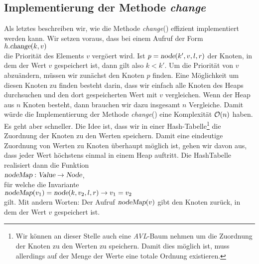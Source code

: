 \subsection{Implementierung der Methode \textsl{change}}
Als letztes beschreiben wir, wie die Methode \textsl{change}() effizient implementiert werden kann.
Wir setzen voraus, dass bei einem Aufruf der Form \\[0.1cm]
\hspace*{1.3cm} $h.\textsl{change}(k,v)$ \\[0.1cm]
die Priorit\"at des Elements $v$ verg\"o\3ert wird.  Ist $p = \textsl{node}(k',v,l,r)$ der Knoten,
in dem der Wert $v$ gespeichert ist, dann gilt also $k < k'$.  Um die Priorit\"at von $v$
abzu\"andern, m\"ussen wir zun\"achst den Knoten $p$ finden.  Eine M\"oglichkeit um diesen Knoten
zu finden besteht darin, dass wir einfach alle Knoten des Heaps durchsuchen und den dort
gespeicherten Wert mit $v$ vergleichen.  Wenn der Heap aus  $n$ Knoten besteht,
dann brauchen wir dazu insgesamt $n$ Vergleiche.  Damit w\"urde die Implementierung der Methode
\textsl{change}() eine Komplexit\"at $\mathcal{O}(n)$ haben.  Es geht aber schneller.  Die Idee ist,
dass wir in einer Hash-Tabelle\footnote{Wir k\"onnen an dieser Stelle auch eine
  \textsl{AVL}-Baum nehmen um die Zuordnung der Knoten zu den Werten zu speichern.
Damit dies m\"oglich ist, muss allerdings auf der Menge der Werte eine totale Ordnung existieren.
}
 die Zuordnung der Knoten zu den Werten speichern.  
Damit eine eindeutige Zuordnung von Werten zu Knoten \"uberhaupt m\"oglich ist, gehen wir
davon aus, dass jeder Wert h\"ochstens einmal in einem Heap auftritt.
Die HashTabelle realisiert dann die Funktion \\[0.1cm]
\hspace*{1.3cm} $\textsl{nodeMap}: \textsl{Value} \rightarrow \textsl{Node}$, \\[0.1cm]
f\"ur welche die Invariante \\[0.1cm]
\hspace*{1.3cm} $\textsl{nodeMap}(v_1) = \textsl{node}(k,v_2,l,r) \rightarrow v_1 = v_2$ \\[0.1cm]
gilt. Mit andern Worten: Der Aufruf $\textsl{nodeMap}(v)$ gibt den Knoten zur\"uck, in dem
der Wert $v$ gespeichert ist.  

